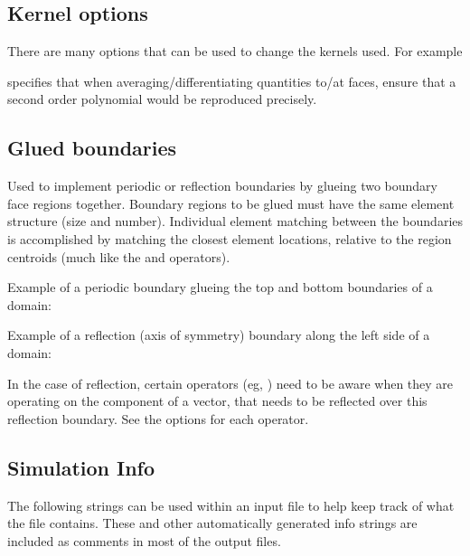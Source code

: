 \subsection{Kernel options}


There are many options that can be used to change the kernels used.  For example


specifies that when averaging/differentiating quantities to/at faces, ensure that a second order polynomial would be reproduced precisely.

\subsection{Glued boundaries}

Used to implement periodic or reflection boundaries by glueing two boundary face regions together.  Boundary regions to be glued must have the same element structure (size and number).  Individual element matching between the boundaries is accomplished by matching the closest element locations, relative to the region centroids (much like the  and  operators).

Example of a periodic boundary glueing the top and bottom boundaries of a domain:


Example of a reflection (axis of symmetry) boundary along the left side of a domain:


In the case of reflection, certain operators (eg, ) need to be aware when they are operating on the component of a vector, that needs to be reflected over this reflection boundary.  See the  options for each operator.

\subsection{Simulation Info}

The following strings can be used within an input file to help keep track of what the file contains.  These and other automatically generated info strings are included as comments in most of the output files.

